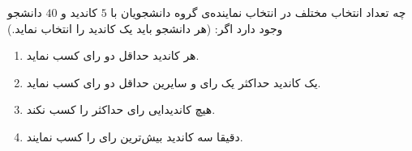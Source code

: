 \EXERCISE
چه تعداد انتخاب مختلف در انتخاب نماینده‌ی گروه دانشجویان با
$5$
کاندید و
$40$
دانشجو وجود دارد اگر: (هر دانشجو باید یک کاندید را انتخاب نماید.)
\begin{enumerate}
\item
هر کاندید حداقل دو رای کسب نماید.
\item
یک کاندید حداکثر یک رای و سایرین حداقل دو رای کسب نماید.
\item
هیچ کاندیدایی رای حداکثر را کسب نکند.
\item
دقیقا سه کاندید بیش‌ترین رای را کسب نمایند.
\end{enumerate}
